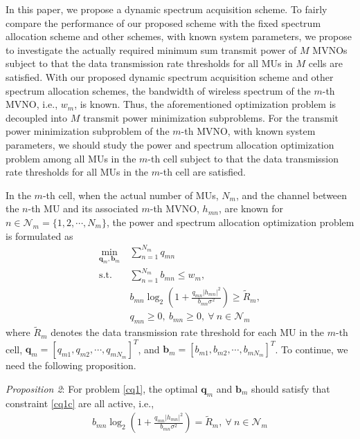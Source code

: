 \documentclass[journal]{IEEEtran}
\begin{document}
In this paper, we propose a dynamic spectrum acquisition scheme. To fairly compare the performance of our proposed scheme with the fixed spectrum allocation scheme and other schemes, with known system parameters, we propose to investigate the actually required minimum sum transmit power of $M$ MVNOs subject to that the data transmission rate thresholds for all MUs in $M$ cells are satisfied. With our proposed dynamic spectrum acquisition scheme and other spectrum allocation schemes, the bandwidth of wireless spectrum of the $m$-th MVNO, i.e., $w_m$, is known. Thus, the aforementioned optimization problem is decoupled into $M$ transmit power minimization subproblems. For the transmit power minimization subproblem of the $m$-th MVNO, with known system parameters, we should study the power and spectrum allocation optimization problem among all MUs in the $m$-th cell subject to that the data transmission rate thresholds for all MUs in the $m$-th cell are satisfied.

In the $m$-th cell, when the actual number of MUs, $N_m$, and the channel between the $n$-th MU and its associated $m$-th MVNO, $h_{mn}$, are known for $n\in\mathcal{N}_m=\{1,2,\cdots,N_m\}$, the power and spectrum allocation optimization problem is formulated as
\begin{subequations}\label{cq1}
\begin{align}
\label{cq1a} \min_{\mathbf{q}_m, \mathbf{b}_m}\ & \sum\limits_{n=1}^{N_m} q_{mn} \\
\label{cq1b}\mbox{s.t.} \quad &  \sum\limits_{n=1}^{N_m} b_{mn} \leq w_m,\\ \label{cq1c}&  b_{mn}\log_2\left(1 + \frac{q_{mn}\left|h_{mn}\right|^2}{b_{mn}\sigma^2}\right) \geq \tilde{R}_m,\\
\label{cq1d}& q_{mn} \geq 0,\ b_{mn} \geq 0,\ \forall\ n\in\mathcal{N}_m
\end{align}
\end{subequations}
where $\tilde{R}_m$ denotes the data transmission rate threshold for each
MU in the $m$-th cell, $\mathbf{q}_m=\left[q_{m1}, q_{m2}, \cdots, q_{mN_m}\right]^T$, and $\mathbf{b}_m=\left[b_{m1}, b_{m2}, \cdots, b_{mN_m}\right]^T$. To continue, we need the following proposition.

\textit{Proposition 2}: For problem \eqref{cq1}, the optimal $\mathbf{q}_m$ and $\mathbf{b}_m$ should satisfy that constraint \eqref{cq1c} are all active, i.e.,
\begin{align}
b_{mn}\log_2\left(1 + \frac{q_{mn}\left|h_{mn}\right|^2}{b_{mn}\sigma^2}\right)= \tilde{R}_m,\  \forall \ n\in\mathcal{N}_m
\end{align}
\end{document}
